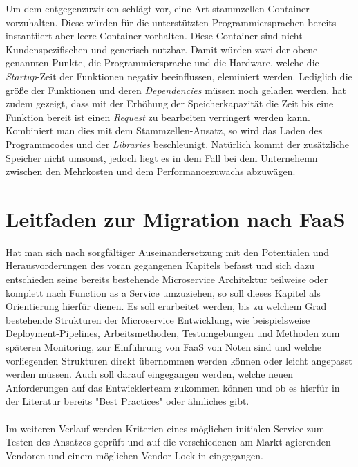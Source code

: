 \documentclass[11pt]{article}
\begin{document}
Um dem entgegenzuwirken schlägt \cite{castro2019server} vor, eine Art stammzellen Container vorzuhalten. Diese würden für die unterstützten Programmiersprachen bereits instantiiert aber leere Container vorhalten. Diese Container sind nicht Kundenspezifischen und generisch nutzbar. Damit würden zwei der obene genannten Punkte, die Programmiersprache und die Hardware, welche die \textit{Startup}-Zeit der Funktionen negativ beeinflussen, eleminiert werden. Lediglich die größe der Funktionen und deren \textit{Dependencies} müssen noch geladen werden. \cite{ishakian2018serving} hat zudem gezeigt, dass mit der Erhöhung der Speicherkapazität die Zeit bis eine Funktion bereit ist einen \textit{Request} zu bearbeiten verringert werden kann. Kombiniert man dies mit dem Stammzellen-Ansatz, so wird das Laden des Programmcodes und der \textit{Libraries} beschleunigt. Natürlich kommt der zusätzliche Speicher nicht umsonst, jedoch liegt es in dem Fall bei dem Unternehemn zwischen den Mehrkosten und dem Performancezuwachs abzuwägen. \\
\newpage









\section{Leitfaden zur Migration nach FaaS}
Hat man sich nach sorgfältiger Auseinandersetzung mit den \cite{baldini2017serverless} Potentialen und Herausvorderungen des voran gegangenen Kapitels befasst und sich dazu entschieden seine bereits bestehende Microservice Architektur teilweise oder komplett nach Function as a Service umzuziehen, so soll dieses Kapitel als Orientierung hierfür dienen. Es soll erarbeitet werden, bis zu welchem Grad bestehende Strukturen der Microservice Entwicklung, wie beispielsweise Deployment-Pipelines, Arbeitsmethoden, Testumgebungen und Methoden zum späteren Monitoring, zur Einführung von FaaS von Nöten sind und welche vorliegenden Strukturen direkt übernommen werden können oder leicht angepasst werden müssen. Auch soll darauf eingegangen werden, welche neuen Anforderungen auf das Entwicklerteam zukommen können und ob es hierfür in der Literatur bereits "Best Practices" oder ähnliches gibt. 
\\\\
Im weiteren Verlauf werden Kriterien eines möglichen initialen Service zum Testen des Ansatzes geprüft und auf die verschiedenen am Markt agierenden Vendoren und einem möglichen Vendor-Lock-in eingegangen. 
\end{document}
